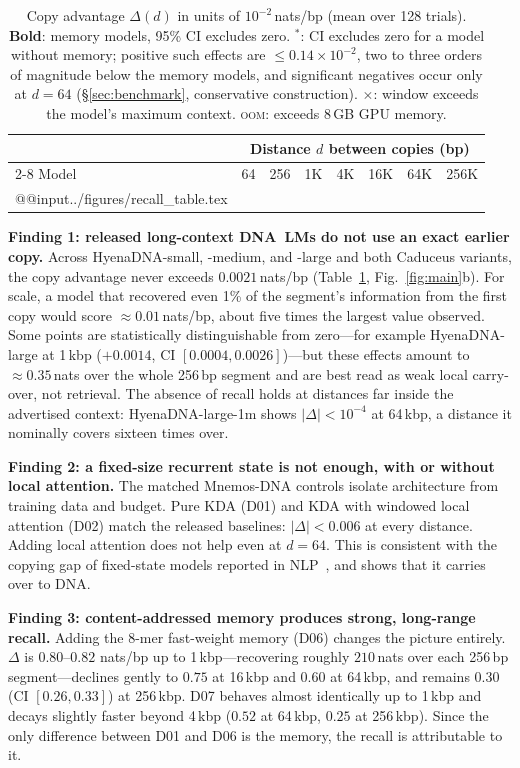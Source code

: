 \begin{table}[t]
\centering
\caption{Copy advantage $\Delta(d)$ in units of $10^{-2}$\,nats/bp (mean over 128 trials).
\textbf{Bold}: memory models, 95\% CI excludes zero. $^*$: CI excludes zero for a model
without memory; positive such effects are $\le 0.14\times10^{-2}$, two to three orders of
magnitude below the memory models, and significant negatives occur only at $d=64$
(\S\ref{sec:benchmark}, conservative construction). $\times$: window exceeds the model's maximum
context. \textsc{oom}: exceeds 8\,GB GPU memory.}
\label{tab:results}
\small
\begin{tabular}{@{}lrrrrrrr@{}}
\toprule
& \multicolumn{7}{c}{Distance $d$ between copies (bp)} \\
\cmidrule(l){2-8}
Model & 64 & 256 & 1K & 4K & 16K & 64K & 256K \\
\midrule
\csname @@input\endcsname ../figures/recall_table.tex
\bottomrule
\end{tabular}
\end{table}

\textbf{Finding 1: released long-context DNA~LMs do not use an exact earlier copy.}
Across HyenaDNA-small, -medium, and -large and both Caduceus variants, the copy advantage never
exceeds $0.0021$\,nats/bp (Table~\ref{tab:results}, Fig.~\ref{fig:main}b). For scale, a
model that recovered even 1\% of the segment's information from the first copy would score
$\approx 0.01$\,nats/bp, about five times the largest value observed. Some points are
statistically distinguishable from zero---for example HyenaDNA-large at 1\,kbp
($+0.0014$, CI $[0.0004, 0.0026]$)---but these effects amount to $\approx 0.35$\,nats over
the whole 256\,bp segment and are best read as weak local carry-over, not retrieval. The
absence of recall holds at distances far inside the advertised context: HyenaDNA-large-1m
shows $|\Delta| < 10^{-4}$ at 64\,kbp, a distance it nominally covers sixteen times over.

\textbf{Finding 2: a fixed-size recurrent state is not enough, with or without local
attention.} The matched Mnemos-DNA controls isolate architecture from training data and
budget. Pure KDA (D01) and KDA with windowed local attention (D02) match the released
baselines: $|\Delta| < 0.006$ at every distance. Adding local attention does not help even at $d=64$. This is consistent with the copying
gap of fixed-state models reported in NLP~\cite{jelassi2024repeat,arora2024zoology}, and
shows that it carries over to DNA.

\textbf{Finding 3: content-addressed memory produces strong, long-range recall.} Adding the
8-mer fast-weight memory (D06) changes the picture entirely. $\Delta$ is $0.80$--$0.82$
nats/bp up to 1\,kbp---recovering roughly $210$\,nats over each 256\,bp segment---declines
gently to $0.75$ at 16\,kbp and $0.60$ at 64\,kbp, and remains $0.30$ (CI $[0.26,0.33]$) at
256\,kbp. D07 behaves almost identically up to 1\,kbp and decays slightly faster beyond
4\,kbp ($0.52$ at 64\,kbp, $0.25$ at 256\,kbp). Since the only difference between D01 and D06
is the memory, the recall is attributable to it.

